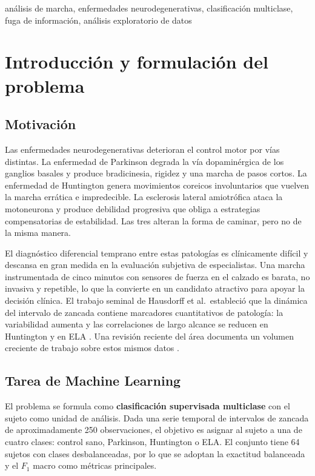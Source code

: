 \documentclass[conference]{IEEEtran}
\begin{document}
\begin{IEEEkeywords}
análisis de marcha, enfermedades neurodegenerativas, clasificación multiclase, fuga de información, análisis exploratorio de datos
\end{IEEEkeywords}

\section{Introducción y formulación del problema}

\subsection{Motivación}

Las enfermedades neurodegenerativas deterioran el control motor por vías distintas. La enfermedad de Parkinson degrada la vía dopaminérgica de los ganglios basales y produce bradicinesia, rigidez y una marcha de pasos cortos. La enfermedad de Huntington genera movimientos coreicos involuntarios que vuelven la marcha errática e impredecible. La esclerosis lateral amiotrófica ataca la motoneurona y produce debilidad progresiva que obliga a estrategias compensatorias de estabilidad. Las tres alteran la forma de caminar, pero no de la misma manera.

El diagnóstico diferencial temprano entre estas patologías es clínicamente difícil y descansa en gran medida en la evaluación subjetiva de especialistas. Una marcha instrumentada de cinco minutos con sensores de fuerza en el calzado es barata, no invasiva y repetible, lo que la convierte en un candidato atractivo para apoyar la decisión clínica. El trabajo seminal de Hausdorff et al.\ estableció que la dinámica del intervalo de zancada contiene marcadores cuantitativos de patología: la variabilidad aumenta y las correlaciones de largo alcance se reducen en Huntington \cite{hausdorff1997} y en ELA \cite{hausdorff2000}. Una revisión reciente del área documenta un volumen creciente de trabajo sobre estos mismos datos \cite{gaitsurvey2024}.

\subsection{Tarea de Machine Learning}

El problema se formula como \textbf{clasificación supervisada multiclase} con el sujeto como unidad de análisis. Dada una serie temporal de intervalos de zancada de aproximadamente 250 observaciones, el objetivo es asignar al sujeto a una de cuatro clases: control sano, Parkinson, Huntington o ELA. El conjunto tiene 64 sujetos con clases desbalanceadas, por lo que se adoptan la exactitud balanceada y el $F_1$ macro como métricas principales.
\end{document}
